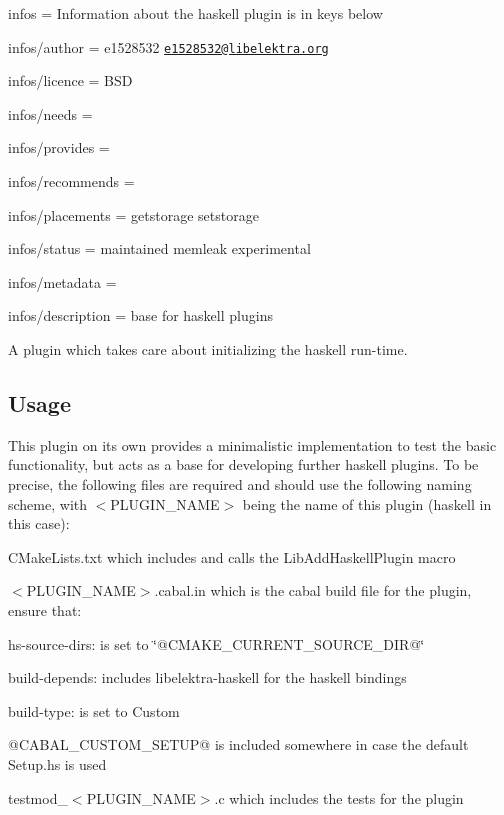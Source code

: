 
\begin{DoxyItemize}
\item infos = Information about the haskell plugin is in keys below
\item infos/author = e1528532 \href{mailto:e1528532@libelektra.org}{\tt e1528532@libelektra.\+org}
\item infos/licence = B\+SD
\item infos/needs =
\item infos/provides =
\item infos/recommends =
\item infos/placements = getstorage setstorage
\item infos/status = maintained memleak experimental
\item infos/metadata =
\item infos/description = base for haskell plugins
\end{DoxyItemize}

A plugin which takes care about initializing the haskell run-\/time.

\subsection*{Usage}

This plugin on its own provides a minimalistic implementation to test the basic functionality, but acts as a base for developing further haskell plugins. To be precise, the following files are required and should use the following naming scheme, with {\ttfamily $<$P\+L\+U\+G\+I\+N\+\_\+\+N\+A\+ME$>$} being the name of this plugin ({\ttfamily haskell} in this case)\+:


\begin{DoxyItemize}
\item C\+Make\+Lists.\+txt which includes and calls the Lib\+Add\+Haskell\+Plugin macro
\item {\ttfamily $<$P\+L\+U\+G\+I\+N\+\_\+\+N\+A\+ME$>$.cabal.\+in} which is the cabal build file for the plugin, ensure that\+:
\begin{DoxyItemize}
\item {\ttfamily hs-\/source-\/dirs\+:} is set to {\ttfamily \char`\"{}@\+C\+M\+A\+K\+E\+\_\+\+C\+U\+R\+R\+E\+N\+T\+\_\+\+S\+O\+U\+R\+C\+E\+\_\+\+D\+I\+R@\char`\"{}}
\item {\ttfamily build-\/depends\+:} includes {\ttfamily libelektra-\/haskell} for the haskell bindings
\item {\ttfamily build-\/type\+:} is set to {\ttfamily Custom}
\item {\ttfamily @C\+A\+B\+A\+L\+\_\+\+C\+U\+S\+T\+O\+M\+\_\+\+S\+E\+T\+UP@} is included somewhere in case the default Setup.\+hs is used
\end{DoxyItemize}
\item {\ttfamily testmod\+\_\+$<$P\+L\+U\+G\+I\+N\+\_\+\+N\+A\+ME$>$.c} which includes the tests for the plugin
\end{DoxyItemize}

